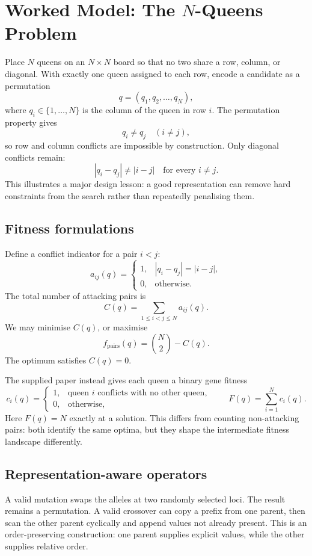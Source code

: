 \documentclass[11pt,a4paper]{article}
\begin{document}
\section{Worked Model: The \texorpdfstring{$N$}{N}-Queens Problem}

Place $N$ queens on an $N\times N$ board so that no two share a row, column,
or diagonal.  With exactly one queen assigned to each row, encode a candidate
as a permutation
\[
  q=(q_1,q_2,\ldots,q_N),
\]
where $q_i\in\{1,\ldots,N\}$ is the column of the queen in row $i$.  The
permutation property gives
\[
  q_i\neq q_j \quad (i\neq j),
\]
so row and column conflicts are impossible by construction.  Only diagonal
conflicts remain:
\[
  |q_i-q_j|\neq |i-j| \quad\text{for every }i\neq j.
\]
This illustrates a major design lesson: a good representation can remove hard
constraints from the search rather than repeatedly penalising them.

\subsection{Fitness formulations}

Define a conflict indicator for a pair $i<j$:
\[
  a_{ij}(q)=
  \begin{cases}
    1, & |q_i-q_j|=|i-j|,\\
    0, & \text{otherwise}.
  \end{cases}
\]
The total number of attacking pairs is
\[
  C(q)=\sum_{1\leq i<j\leq N} a_{ij}(q).
\]
We may minimise $C(q)$, or maximise
\[
  f_{\mathrm{pairs}}(q)=\binom{N}{2}-C(q).
\]
The optimum satisfies $C(q)=0$.

The supplied paper instead gives each queen a binary gene fitness
\[
  c_i(q)=
  \begin{cases}
    1, & \text{queen }i\text{ conflicts with no other queen},\\
    0, & \text{otherwise},
  \end{cases}
  \qquad F(q)=\sum_{i=1}^{N}c_i(q).
\]
Here $F(q)=N$ exactly at a solution.  This differs from counting non-attacking
pairs: both identify the same optima, but they shape the intermediate fitness
landscape differently.

\subsection{Representation-aware operators}

A valid mutation swaps the alleles at two randomly selected loci.  The result
remains a permutation.  A valid crossover can copy a prefix from one parent,
then scan the other parent cyclically and append values not already present.
This is an order-preserving construction: one parent supplies explicit
values, while the other supplies relative order.
\end{document}
